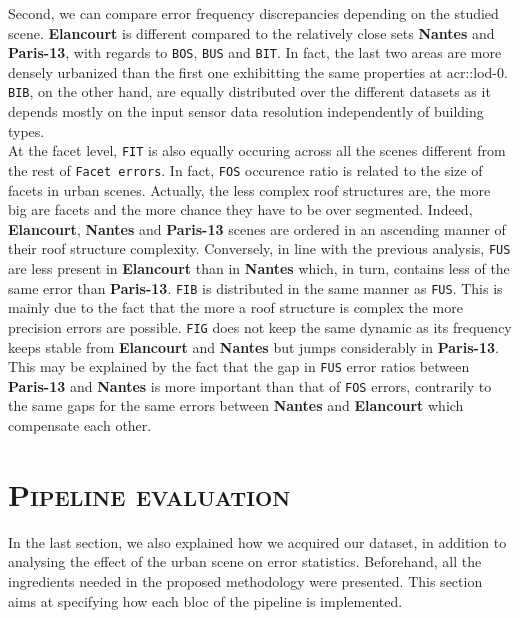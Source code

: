         Second, we can compare error frequency discrepancies depending on the studied scene.
        \textbf{Elancourt} is different compared to the relatively close sets \textbf{Nantes} and \textbf{Paris-13}, with regards to \texttt{BOS}, \texttt{BUS} and \texttt{BIT}.
        In fact, the last two areas are more densely urbanized than the first one exhibitting the same properties at \gls{acr::lod}-0.
        \texttt{BIB}, on the other hand, are equally distributed over the different datasets as it depends mostly on the input sensor data resolution independently of building types.\\
        At the facet level, \texttt{FIT} is also equally occuring across all the scenes different from the rest of \texttt{Facet errors}.
        In fact, \texttt{FOS} occurence ratio is related to the size of facets in urban scenes.
        Actually, the less complex roof structures are, the more big are facets and the more chance they have to be over segmented.
        Indeed, \textbf{Elancourt}, \textbf{Nantes} and \textbf{Paris-13} scenes are ordered in an ascending manner of their roof structure complexity.
        Conversely, in line with the previous analysis, \texttt{FUS} are less present in \textbf{Elancourt} than in \textbf{Nantes} which, in turn, contains less of the same error than \textbf{Paris-13}.
        \texttt{FIB} is distributed in the same manner as \texttt{FUS}.
        This is mainly due to the fact that the more a roof structure is complex the more precision errors are possible.
        \texttt{FIG} does not keep the same dynamic as its frequency keeps stable from \textbf{Elancourt} and \textbf{Nantes} but jumps considerably in \textbf{Paris-13}.
        This may be explained by the fact that the gap in \texttt{FUS} error ratios between \textbf{Paris-13} and \textbf{Nantes} is more important than that of \texttt{FOS} errors, contrarily to the same gaps for the same errors between \textbf{Nantes} and \textbf{Elancourt} which compensate each other.

\section{\textsc{Pipeline evaluation}}
    \label{sec::experiments::evaluation}
    In the last section, we also explained how we acquired our dataset, in addition to analysing the effect of the urban scene on error statistics.
    Beforehand, all the ingredients needed in the proposed methodology were presented.
    This section aims at specifying how each bloc of the pipeline is implemented.\\

